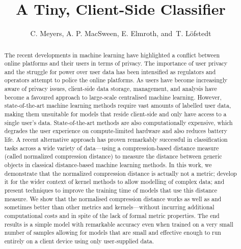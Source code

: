 \documentclass[preprint,12pt]{article}
\begin{document}
\title{A Tiny, Client-Side Classifier}


\author{C. Meyers, A. P. MacSween, E. Elmroth, and~T. L\"{o}fstedt}

\maketitle


\begin{abstract}
The recent developments in machine learning have highlighted a conflict between online platforms and their users in terms of privacy. 
The importance of user privacy and the struggle for power over user data has been intensified as regulators and operators attempt to police the online platforms.
As users have become increasingly aware of privacy issues, client-side data storage, management, and analysis have become a favoured approach to large-scale centralised machine learning.
However, state-of-the-art machine learning methods require vast amounts of labelled user data, making them unsuitable for models that reside client-side and only have access to a single user's data.
State-of-the-art methods are also computationally expensive, which degrades the user experience on compute-limited hardware and also reduces battery life.
A recent alternative approach has proven remarkably successful in classification tasks across a wide variety of data---using a compression-based distance measure (called normalized compression distance) to measure the distance between generic objects in classical distance-based machine learning methods.
In this work, we demonstrate that the normalized compression distance is actually not a metric; develop it for the wider context of kernel methods to allow modelling of complex data; and present techniques to improve the training time of models that use this distance measure.
We show that the normalised compression distance works as well as and sometimes better than other metrics and kernels---without incurring additional computational costs and in spite of the lack of formal metric properties.
The end results is a simple model with remarkable accuracy even when trained on a very small number of samples allowing for models that are small and effective enough to run entirely on a client device using only user-supplied data.
\end{abstract}
\end{document}
